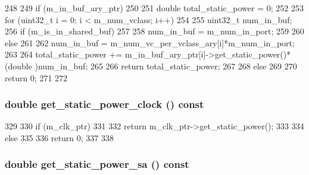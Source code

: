 \begin{DoxyCode}
248 {
249     if (m_in_buf_ary_ptr)
250     {
251         double total_static_power = 0;
252 
253         for (uint32_t i = 0; i < m_num_vclass; i++)
254         {
255             uint32_t num_in_buf;
256             if (m_is_in_shared_buf)
257             {
258                 num_in_buf = m_num_in_port;
259             }
260             else
261             {
262                 num_in_buf = m_num_vc_per_vclass_ary[i]*m_num_in_port;
263             }
264             total_static_power += m_in_buf_ary_ptr[i]->get_static_power()*(double
      )num_in_buf;
265         }
266         return total_static_power;
267     }
268     else
269     {
270         return 0;
271     }
272 }
\end{DoxyCode}
\hypertarget{classOrionRouter_a594c9a7fb80a0920f0aaa00c0bd388bf}{
\subsubsection[{get\_\-static\_\-power\_\-clock}]{\setlength{\rightskip}{0pt plus 5cm}double get\_\-static\_\-power\_\-clock () const}}
\label{classOrionRouter_a594c9a7fb80a0920f0aaa00c0bd388bf}



\begin{DoxyCode}
329 {
330     if (m_clk_ptr)
331     {
332         return m_clk_ptr->get_static_power();
333     }
334     else
335     {
336         return 0;
337     }
338 }
\end{DoxyCode}
\hypertarget{classOrionRouter_a4561aef5ee7a98a073c770968d461e0b}{
\subsubsection[{get\_\-static\_\-power\_\-sa}]{\setlength{\rightskip}{0pt plus 5cm}double get\_\-static\_\-power\_\-sa () const}}
\label{classOrionRouter_a4561aef5ee7a98a073c770968d461e0b}



